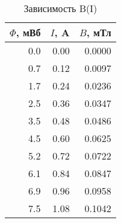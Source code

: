 \begin{table}[h]
\begin{center}
 \caption{Зависимость B(I)}
 \label{table.1}
\begin{tabular}{|*{3}{r|}}
\hline 
$\Phi$, мВб & $I$, A & $B$, мТл\\ \hline 
0.0 & 0.00 & 0.0000 \\ \hline 
 0.7 & 0.12 & 0.0097 \\ \hline 
 1.7 & 0.24 & 0.0236 \\ \hline 
 2.5 & 0.36 & 0.0347 \\ \hline 
 3.5 & 0.48 & 0.0486 \\ \hline 
 4.5 & 0.60 & 0.0625 \\ \hline 
 5.2 & 0.72 & 0.0722 \\ \hline 
 6.1 & 0.84 & 0.0847 \\ \hline 
 6.9 & 0.96 & 0.0958 \\ \hline 
 7.5 & 1.08 & 0.1042 \\ \hline 
 \end{tabular} 
 \end{center}
\end{table} 
